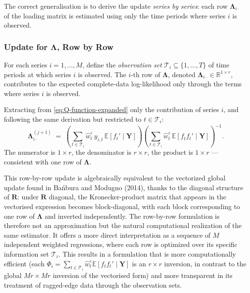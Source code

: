 \documentclass[11pt, a4paper, oneside]{article}
\newcommand{\mY}{\mathbf{Y}}
\newcommand{\mL}{\boldsymbol{\Lambda}}
\newcommand{\mR}{\mathbf{R}}
\begin{document}
The correct generalisation is to derive the update \emph{series by
series}: each row $\mL_{i \cdot}$ of the loading matrix is
estimated using only the time periods where series $i$ is observed.

\subsubsection{Update for \texorpdfstring{$\mL$}{Lambda}, Row by Row}

For each series $i = 1, \ldots, M$, define the \emph{observation set}
$\mathcal{T}_i \subseteq \{1, \ldots, T\}$ of time periods at which
series $i$ is observed. The $i$-th row of $\mL$, denoted
$\mL_{i \cdot} \in \mathbb{R}^{1 \times r}$, contributes to
the expected complete-data log-likelihood only through the terms where
series $i$ is observed.

Extracting from \eqref{eq:Q-function-expanded} only the contribution
of series $i$, and following the same derivation but restricted to $t \in \mathcal{T}_i$:
\begin{equation}
\boxed{\;\;
\mL^{(j+1)}_{i \cdot} \;=\; \left(\sum_{t \in \mathcal{T}_i} \hat{w}^\varepsilon_t\, y_{i,t}\, \mathbb{E}[f_t' \mid \mathbf{Y}]\right)
\left(\sum_{t \in \mathcal{T}_i} \hat{w}^\varepsilon_t\, \mathbb{E}[f_t f_t' \mid \mathbf{Y}]\right)^{-1}.
\;\;}
\label{eq:Lambda-update-missing}
\end{equation}
The numerator is $1 \times r$, the denominator is $r \times r$, the
product is $1 \times r$ — consistent with one row of $\mL$.

This row-by-row update is algebraically equivalent to the vectorized
global update found in Bańbura and Modugno (2014), thanks to the
diagonal structure of $\mathbf{R}$: under $\mR$ diagonal, the
Kronecker-product matrix that appears in the vectorised expression
becomes block-diagonal, with each block corresponding to one row of
$\mL$ and inverted independently. The row-by-row formulation is
therefore not an approximation but the natural computational
realization of the same estimator. It offers a more direct
interpretation as a sequence of $M$ independent weighted
regressions, where each row is optimized over its specific
information set $\mathcal{T}_i$. This results in a formulation that
is more computationally efficient (each $\Phi_i = \sum_{t \in \mathcal{T}_i}
\hat{w}^\varepsilon_t \mathbb{E}[f_t f_t' \mid \mY]$ is an $r \times r$
inversion, in contrast to the global $Mr \times Mr$ inversion of
the vectorised form) and more transparent in its treatment of
ragged-edge data through the observation sets.
\end{document}
